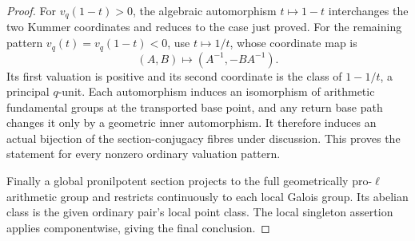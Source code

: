 \begin{proof}
For \(v_q(1-t)>0\), the algebraic automorphism
\(t\mapsto1-t\) interchanges the two Kummer
coordinates and reduces to the case just proved.
For the remaining pattern \(v_q(t)=v_q(1-t)<0\),
use \(t\mapsto1/t\), whose coordinate map is
\[
          (A,B)\longmapsto(A^{-1},-BA^{-1}).
\]
Its first valuation is positive and its second
coordinate is the class of \(1-1/t\), a principal
\(q\)-unit. Each automorphism induces an isomorphism
of arithmetic fundamental groups at the transported
base point, and any return base path changes it only
by a geometric inner automorphism. It therefore
induces an actual bijection of the section-conjugacy
fibres under discussion. This proves the statement
for every nonzero ordinary valuation pattern.

Finally a global pronilpotent section projects to
the full geometrically pro-\(\ell\) arithmetic
group and restricts continuously to each local
Galois group. Its abelian class is the given
ordinary pair's local point class. The local
singleton assertion applies componentwise, giving
the final conclusion.
\end{proof}
